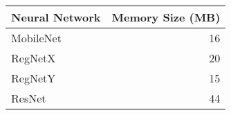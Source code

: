 \begin{tabular}{lr}
\toprule
Neural Network & Memory Size (MB) \\
\midrule
MobileNet & 16 \\
RegNetX & 20 \\
RegNetY & 15 \\
ResNet & 44 \\
\bottomrule
\end{tabular}
